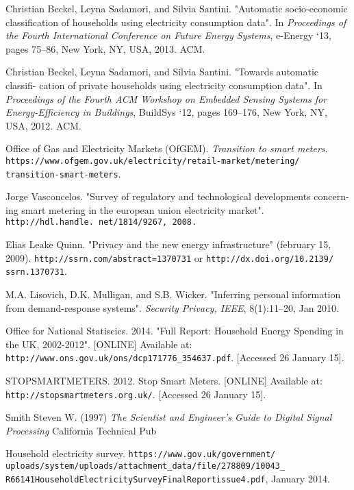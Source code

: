 \documentclass[12pt,a4paper]{report}
\begin{document}
\begin{thebibliography}{9}

 Christian Beckel, Leyna Sadamori, and Silvia Santini. "Automatic socio-economic classification of households using electricity consumption data". In {\em Proceedings of the Fourth International Conference on Future Energy Systems}, e-Energy `13, pages 75–86, New York, NY, USA, 2013. ACM.

 Christian Beckel, Leyna Sadamori, and Silvia Santini. "Towards automatic classifi- cation of private households using electricity consumption data". In {\em Proceedings of the Fourth ACM Workshop on Embedded Sensing Systems for Energy-Efficiency in Buildings}, BuildSys `12, pages 169–176, New York, NY, USA, 2012. ACM.

 Office of Gas and Electricity Markets (OfGEM). {\em Transition to smart meters}. {\tt https://www.ofgem.gov.uk/electricity/retail-market/metering/ transition-smart-meters}.

 Jorge Vasconcelos. "Survey of regulatory and technological developments concern- ing smart metering in the european union electricity market". {\tt http://hdl.handle. net/1814/9267, 2008.}

 Elias Leake Quinn. "Privacy and the new energy infrastructure" (february 15, 2009). \texttt{http://ssrn.com/abstract=1370731} or \texttt{http://dx.doi.org/10.2139/ ssrn.1370731}.

 M.A. Lisovich, D.K. Mulligan, and S.B. Wicker. "Inferring personal information from demand-response systems". \textit{Security Privacy, IEEE}, 8(1):11–20, Jan 2010.

 Office for National Statiscics. 2014. "Full Report: Household Energy Spending in the UK, 2002-2012". [ONLINE] Available at: \texttt{http://www.ons.gov.uk/ons/dcp171776\_354637.pdf}. [Accessed 26 January 15].

STOPSMARTMETERS. 2012. Stop Smart Meters. [ONLINE] Available at: \texttt{http://stopsmartmeters.org.uk/}. [Accessed 26 January 15].

 Smith Steven W. (1997) \textit{The Scientist and Engineer's Guide to Digital Signal Processing} California Technical Pub

Household electricity survey. \texttt{https://www.gov.uk/government/ uploads/system/uploads/attachment\_data/file/278809/10043\_ R66141HouseholdElectricitySurveyFinalReportissue4.pdf}, January 2014.


\end{thebibliography}
\end{document}
